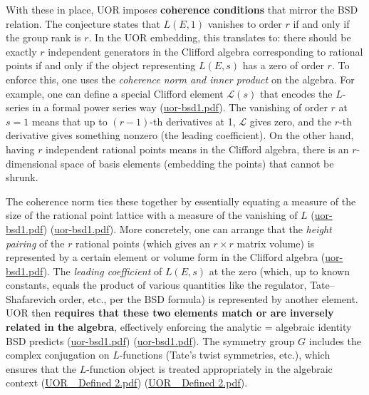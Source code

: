 \documentclass[12pt]{article}
\begin{document}
\medskip

With these in place, UOR imposes \textbf{coherence conditions} that mirror the BSD relation. The conjecture states that $L(E,1)$ vanishes to order $r$ if and only if the group rank is $r$. In the UOR embedding, this translates to: there should be exactly $r$ independent generators in the Clifford algebra corresponding to rational points if and only if the object representing $L(E,s)$ has a zero of order $r$. To enforce this, one uses the \emph{coherence norm and inner product} on the algebra. For example, one can define a special Clifford element $\mathcal{L}(s)$ that encodes the $L$-series in a formal power series way (\href{file://file-QX2RAaHV3sY1bCttwB4hkL#:~:text=%24%5CPhi%24%29.%20The%20,L%7D%281%2B%5Cepsilon%29%24%20for%20small}{uor-bsd1.pdf}). The vanishing of order $r$ at $s=1$ means that up to $(r-1)$-th derivatives at 1, $\mathcal{L}$ gives zero, and the $r$-th derivative gives something nonzero (the leading coefficient). On the other hand, having $r$ independent rational points means in the Clifford algebra, there is an $r$-dimensional space of basis elements (embedding the points) that cannot be shrunk.

\medskip

The coherence norm ties these together by essentially equating a measure of the size of the rational point lattice with a measure of the vanishing of $L$ (\href{file://file-QX2RAaHV3sY1bCttwB4hkL#:~:text=by%20%24r%24%20basis%20vectors%20in,p%7CN}{uor-bsd1.pdf}) (\href{file://file-QX2RAaHV3sY1bCttwB4hkL#:~:text=leading%20coefficient%20on%20the%20analytic,Clifford%20volume%20is%20nonzero%2C%20which}{uor-bsd1.pdf}). More concretely, one can arrange that the \emph{height pairing} of the $r$ rational points (which gives an $r\times r$ matrix volume) is represented by a certain element or volume form in the Clifford algebra (\href{file://file-QX2RAaHV3sY1bCttwB4hkL#:~:text=by%20%24r%24%20basis%20vectors%20in,p%7CN}{uor-bsd1.pdf}). The \emph{leading coefficient} of $L(E,s)$ at the zero (which, up to known constants, equals the product of various quantities like the regulator, Tate--Shafarevich order, etc., per the BSD formula) is represented by another element. UOR then \textbf{requires that these two elements match or are inversely related in the algebra}, effectively enforcing the analytic = algebraic identity BSD predicts (\href{file://file-QX2RAaHV3sY1bCttwB4hkL#:~:text=by%20%24r%24%20basis%20vectors%20in,p%7CN}{uor-bsd1.pdf}) (\href{file://file-QX2RAaHV3sY1bCttwB4hkL#:~:text=fixed%20constants,internal%20consistency%3A%20no%20extraneous%20scaling}{uor-bsd1.pdf}). The symmetry group $G$ includes the complex conjugation on $L$-functions (Tate’s twist symmetries, etc.), which ensures that the $L$-function object is treated appropriately in the algebraic context (\href{file://file-TBF3nHDaRR5QeVMmwCFYkp#:~:text=%24Cl,mapsto%20s%2B2k%24%20perhaps}{UOR\_ Defined 2.pdf}) (\href{file://file-TBF3nHDaRR5QeVMmwCFYkp#:~:text=match%20at%20L1055%20,This%20unified}{UOR\_ Defined 2.pdf}).
\end{document}
